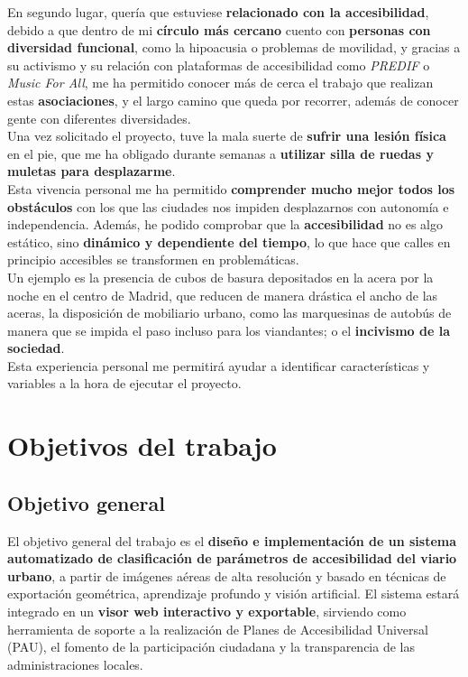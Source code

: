 En segundo lugar, quería que estuviese \textbf{relacionado con la accesibilidad}, debido a que dentro de mi \textbf{círculo más cercano} cuento con \textbf{personas con diversidad funcional}, como la hipoacusia o problemas de movilidad, y gracias a su activismo y su relación con plataformas de accesibilidad como \textit{PREDIF} o \textit{Music For All}, me ha permitido conocer más de cerca el trabajo que realizan estas \textbf{asociaciones}, y el largo camino que queda por recorrer, además de conocer gente con diferentes diversidades.
\\

Una vez solicitado el proyecto, tuve la mala suerte de \textbf{sufrir una lesión física} en el pie, que me ha obligado durante semanas a \textbf{utilizar silla de ruedas y muletas para desplazarme}.
\\

Esta vivencia personal me ha permitido \textbf{comprender mucho mejor todos los obstáculos} con los que las ciudades nos impiden desplazarnos con autonomía e independencia.
Además, he podido comprobar que la \textbf{accesibilidad} no es algo estático, sino \textbf{dinámico y dependiente del tiempo}, lo que hace que calles en principio accesibles se transformen en problemáticas.
\\

Un ejemplo es la presencia de cubos de basura depositados en la acera por la noche en el centro de Madrid, que reducen de manera drástica el ancho de las aceras, la disposición de mobiliario urbano, como las marquesinas de autobús de manera que se impida el paso incluso para los viandantes; o el \textbf{incivismo de la sociedad}.
\\

Esta experiencia personal me permitirá ayudar a identificar características y variables a la hora de ejecutar el proyecto.
\\

\section{Objetivos del trabajo}

\subsection{Objetivo general}

El objetivo general del trabajo es el \textbf{diseño e implementación de un sistema automatizado de clasificación de parámetros de accesibilidad del viario urbano}, a partir de  imágenes aéreas de alta resolución y basado en técnicas de exportación geométrica, aprendizaje profundo y visión artificial. El sistema estará integrado en un \textbf{visor web interactivo y exportable}, sirviendo como herramienta de soporte a la realización de Planes de Accesibilidad Universal (PAU), el fomento de la participación ciudadana y la transparencia de las administraciones locales.

